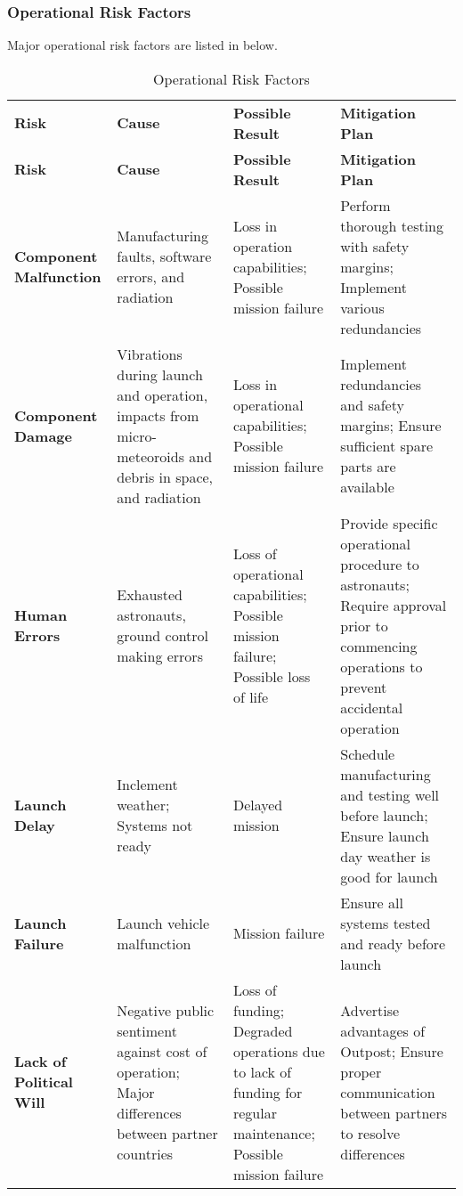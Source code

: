 \subsubsection{Operational Risk Factors}
\label{risks}
Major operational risk factors are listed in  below.
\begin{longtable}{|P{2.7cm}|P{3.8cm}|P{3.8cm}|P{4.5cm}|}
\caption{Operational Risk Factors}\label{risktable}\\\hline
\textbf{Risk}				&	\textbf{Cause}		&	\textbf{Possible Result}		&	\textbf{Mitigation Plan}	\\\hhline{|=|=|=|=|}
\endfirsthead
\hline
\textbf{Risk}				&	\textbf{Cause}		&	\textbf{Possible Result}		&	\textbf{Mitigation Plan}		\\\hhline{|=|=|=|=|}
\endhead
\textbf{Component Malfunction}	&	Manufacturing faults, software errors, and radiation	&	Loss in operation capabilities; Possible mission failure	&	Perform thorough testing with safety margins; Implement various redundancies	\\\hline
\textbf{Component Damage}	&	Vibrations during launch and operation, impacts from micro-meteoroids and debris in space, and radiation		&	Loss in operational capabilities; Possible mission failure	&	Implement redundancies and safety margins; Ensure sufficient spare parts are available	\\\hline
\textbf{Human Errors}		&	Exhausted astronauts, ground control making errors	&	Loss of operational capabilities; Possible mission failure; Possible loss of life	&	Provide specific operational procedure to astronauts; Require approval prior to commencing operations to prevent accidental operation	\\\hline
\textbf{Launch Delay}	&	Inclement weather; Systems not ready	&	Delayed mission	& Schedule manufacturing and testing well before launch; Ensure launch day weather is good for launch	\\\hline
\textbf{Launch Failure}	&	Launch vehicle malfunction	&	Mission failure	&	Ensure all systems tested and ready before launch	\\\hline	
\textbf{Lack of Political Will}	&	Negative public sentiment against cost of operation; Major differences between partner countries	&	Loss of funding; Degraded operations due to lack of funding for regular maintenance; Possible mission failure	&	Advertise advantages of Outpost; Ensure proper communication between partners to resolve differences	\\\hline
\end{longtable}
	

